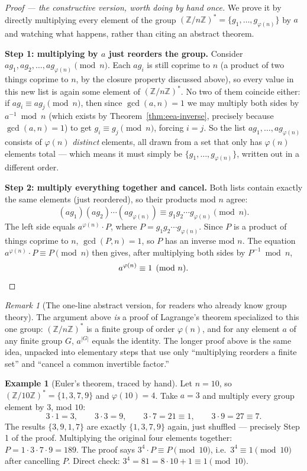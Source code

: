 \documentclass[11pt]{article}
\theoremstyle{definition}
\newtheorem{example}[theorem]{Example}
\theoremstyle{remark}
\newtheorem{remark}[theorem]{Remark}
\begin{document}
\begin{proof}[Proof --- the constructive version, worth doing by hand once]
We prove it by directly multiplying every element of the group $(\mathbb{Z}/n\mathbb{Z})^{*} = \{g_1,\dots,g_{\varphi(n)}\}$ by $a$ and watching what happens, rather than citing an abstract theorem.

\textbf{Step 1: multiplying by $a$ just reorders the group.} Consider $ag_1, ag_2, \dots, ag_{\varphi(n)} \pmod n$. Each $ag_i$ is still coprime to $n$ (a product of two things coprime to $n$, by the closure property discussed above), so every value in this new list is again some element of $(\mathbb{Z}/n\mathbb{Z})^{*}$. No two of them coincide either: if $ag_i \equiv ag_j \pmod n$, then since $\gcd(a,n)=1$ we may multiply both sides by $a^{-1}\bmod n$ (which exists by Theorem~\ref{thm:eea-inverse}, precisely because $\gcd(a,n)=1$) to get $g_i \equiv g_j \pmod n$, forcing $i=j$. So the list $ag_1,\dots,ag_{\varphi(n)}$ consists of $\varphi(n)$ \emph{distinct} elements, all drawn from a set that only has $\varphi(n)$ elements total — which means it must simply be $\{g_1,\dots,g_{\varphi(n)}\}$, written out in a different order.

\textbf{Step 2: multiply everything together and cancel.} Both lists contain exactly the same elements (just reordered), so their products mod $n$ agree:
\[
(ag_1)(ag_2)\cdots(ag_{\varphi(n)}) \equiv g_1g_2\cdots g_{\varphi(n)} \pmod n.
\]
The left side equals $a^{\varphi(n)}\cdot P$, where $P=g_1g_2\cdots g_{\varphi(n)}$. Since $P$ is a product of things coprime to $n$, $\gcd(P,n)=1$, so $P$ has an inverse mod $n$. The equation $a^{\varphi(n)}\cdot P \equiv P \pmod n$ then gives, after multiplying both sides by $P^{-1}\bmod n$,
\[
a^{\varphi(n)} \equiv 1 \pmod n. \qedhere
\]
\end{proof}

\begin{remark}[The one-line abstract version, for readers who already know group theory]
The argument above \emph{is} a proof of Lagrange's theorem specialized to this one group: $(\mathbb{Z}/n\mathbb{Z})^{*}$ is a finite group of order $\varphi(n)$, and for any element $a$ of any finite group $G$, $a^{|G|}$ equals the identity. The longer proof above is the same idea, unpacked into elementary steps that use only ``multiplying reorders a finite set'' and ``cancel a common invertible factor.''
\end{remark}

\begin{example}[Euler's theorem, traced by hand]
Let $n=10$, so $(\mathbb{Z}/10\mathbb{Z})^{*}=\{1,3,7,9\}$ and $\varphi(10)=4$. Take $a=3$ and multiply every group element by $3$, mod $10$:
\[
3\cdot1=3, \qquad 3\cdot3=9, \qquad 3\cdot7=21\equiv1, \qquad 3\cdot9=27\equiv7.
\]
The results $\{3,9,1,7\}$ are exactly $\{1,3,7,9\}$ again, just shuffled — precisely Step 1 of the proof. Multiplying the original four elements together: $P=1\cdot3\cdot7\cdot9=189$. The proof says $3^4\cdot P\equiv P\pmod{10}$, i.e.\ $3^4\equiv1\pmod{10}$ after cancelling $P$. Direct check: $3^4=81=8\cdot10+1\equiv1\pmod{10}$. \checkmark
\end{example}
\end{document}
